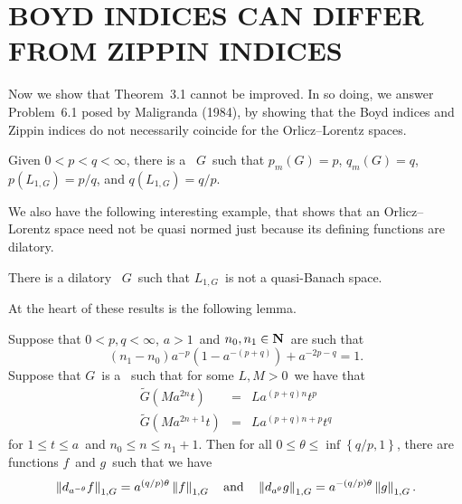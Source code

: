 \section{BOYD INDICES CAN DIFFER FROM ZIPPIN INDICES}

Now we show that Theorem~3.1 cannot be improved.
In so doing, we answer
Problem~6.1 posed by Maligranda (1984), by showing that the Boyd indices
and Zippin indices do not necessarily coincide for the Orlicz--Lorentz 
spaces.

\begin{thm} Given $0<p<q<\infty$, there is a 
\phifunction\ $G$\ such that $p_m(G) = p$, $q_m(G) = q$,
$ p(L_{1,G}) = p/q$, and $q(L_{1,G}) = q/p$.
\end{thm}

We also have the following interesting example, that shows that an
Orlicz--Lorentz space need not be quasi normed just because its defining
functions are dilatory.

\begin{thm} There is a dilatory \phifunction\ $G$\ such that
$L_{1,G}$\ is not a quasi-Banach space.
\end{thm}

At the heart of these results is the following lemma.

\begin{lemma} Suppose that $0<p,q<\infty$, $a>1$\ and $n_0, n_1 \in
{\bf N}$\ are such that
$$ (n_1-n_0) a^{-p}\left(1-a^{-(p+q)}\right) + a^{-2p-q} = 1 .$$
Suppose that $G$\ is a \phifunction\ such that for some $L,M>0$\ we have 
that 
\begin{eqnarray*}
   \tilde G(Ma^{2n}t) &=& La^{(p+q)n}t^p \\
   \tilde G(Ma^{2n+1}t) &=& La^{(p+q)n+p}t^q 
\end{eqnarray*}
for $1\le t\le a$\ and $n_0\le n\le n_1+1$. Then for all\/
$0\le\theta\le\inf\left\{q/p,1\right\}$, there are functions $f$\ and $g$\ 
such
that we have 
$$ \left\| d_{a^{-\theta}}f \right\|_{1,G} 
   = a^{(q/p)\theta} \left\| f \right\|_{1,G}
   \quad\hbox{and}\quad
   \left\| d_{a^{\theta}}g \right\|_{1,G} 
   = a^{-(q/p)\theta} \left\| g \right\|_{1,G} .$$
\end{lemma}

